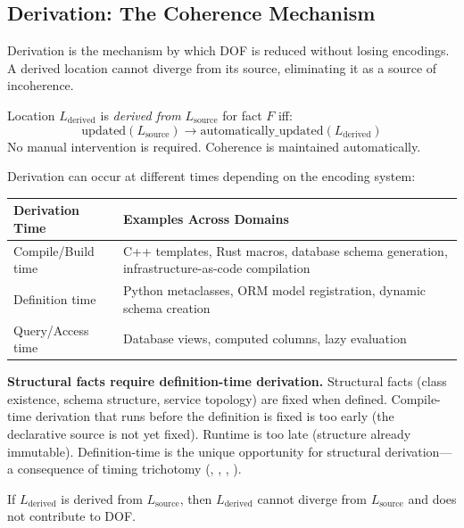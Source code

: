 \subsection{Derivation: The Coherence Mechanism}\label{sec:derivation}

Derivation is the mechanism by which DOF is reduced without losing encodings. A derived location cannot diverge from its source, eliminating it as a source of incoherence.

\begin{definition}[Derivation]\label{def:derivation}
Location $L_{\text{derived}}$ is \emph{derived from} $L_{\text{source}}$ for fact $F$ iff:
\[
\text{updated}(L_{\text{source}}) \rightarrow \text{automatically\_updated}(L_{\text{derived}})
\]
No manual intervention is required. Coherence is maintained automatically.
\end{definition}

Derivation can occur at different times depending on the encoding system:

\begin{center}
\begin{tabularx}{\linewidth}{lY}
\toprule
\textbf{Derivation Time} & \textbf{Examples Across Domains} \\
\midrule
Compile/Build time & C++ templates, Rust macros, database schema generation, infrastructure-as-code compilation \\
Definition time & Python metaclasses, ORM model registration, dynamic schema creation \\
Query/Access time & Database views, computed columns, lazy evaluation \\
\bottomrule
\end{tabularx}
\end{center}

\textbf{Structural facts require definition-time derivation.} Structural facts (class existence, schema structure, service topology) are fixed when defined. Compile-time derivation that runs before the definition is fixed is too early (the declarative source is not yet fixed). Runtime is too late (structure already immutable). Definition-time is the unique opportunity for structural derivation---a consequence of timing trichotomy (, , , ).

\begin{theorem}\label{thm:derivation-excludes}
If $L_{\text{derived}}$ is derived from $L_{\text{source}}$, then $L_{\text{derived}}$ cannot diverge from $L_{\text{source}}$ and does not contribute to DOF.
\end{theorem}

